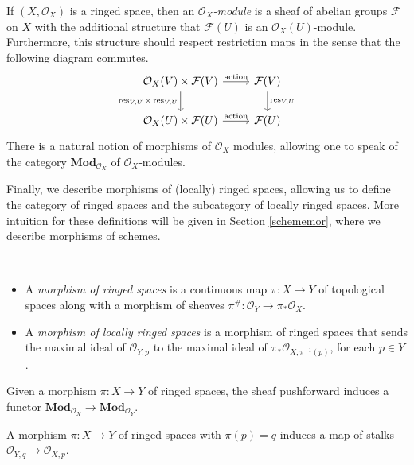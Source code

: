 \documentclass[11pt,openany]{book} %
\begin{document}
\begin{definition}
If $(X,\mathcal{O}_X)$ is a ringed space, then an \emph{$\mathcal{O}_X$-module} is a sheaf of abelian groups $\mathcal{F}$ on $X$ with the additional structure that $\mathcal{F}(U)$ is an $\mathcal{O}_X(U)$-module. Furthermore, this structure should respect restriction maps in the sense that the following diagram commutes.
\[
\begin{tikzcd}
	\mathcal{O}_X(V) \times \mathcal{F}(V) \ar[r, "\operatorname{action}"] \ar[d, swap, "\operatorname{res}_{V,U} \times \operatorname{res}_{V,U}"] & \mathcal{F}(V) \ar[d, "\operatorname{res}_{V,U}"]\\
    \mathcal{O}_X(U) \times \mathcal{F}(U) \ar[r, "\operatorname{action}"]  & \mathcal{F}(U)
\end{tikzcd}
\]
There is a natural notion of morphisms of $\mathcal{O}_X$ modules, allowing one to speak of the category $\mathbf{Mod}_{\mathcal{O}_X}$ of $\mathcal{O}_X$-modules.
\end{definition}
\medskip

Finally, we describe morphisms of (locally) ringed spaces, allowing us to define the category of ringed spaces and the subcategory of locally ringed spaces. More intuition for these definitions will be given in Section \ref{schememor}, where we describe morphisms of schemes.\\

\begin{definition}\
\begin{itemize}
	\item A \emph{morphism of ringed spaces} is a continuous map $\pi : X \to Y$ of topological spaces along with a morphism of sheaves $\pi^{\#} : \mathcal{O}_Y \to \pi_*\mathcal{O}_X$.
	\item A \emph{morphism of locally ringed spaces} is a morphism of ringed spaces that sends the maximal ideal of $\mathcal{O}_{Y,p}$ to the maximal ideal of $\pi_*\mathcal{O}_{X,\pi^{-1}(p)}$, for each $p \in Y$.
\end{itemize}
\end{definition}
\medskip

\begin{example}
Given a morphism $\pi : X \to Y$ of ringed spaces, the sheaf pushforward induces a functor $\mathbf{Mod}_{\mathcal{O}_X} \to \mathbf{Mod}_{\mathcal{O}_Y}$.
\end{example}

\begin{lemma}
A morphism $\pi : X \to Y$ of ringed spaces with $\pi(p) = q$ induces a map of stalks $\mathcal{O}_{Y,q} \to \mathcal{O}_{X,p}$.
\end{lemma}
\medskip
\end{document}
